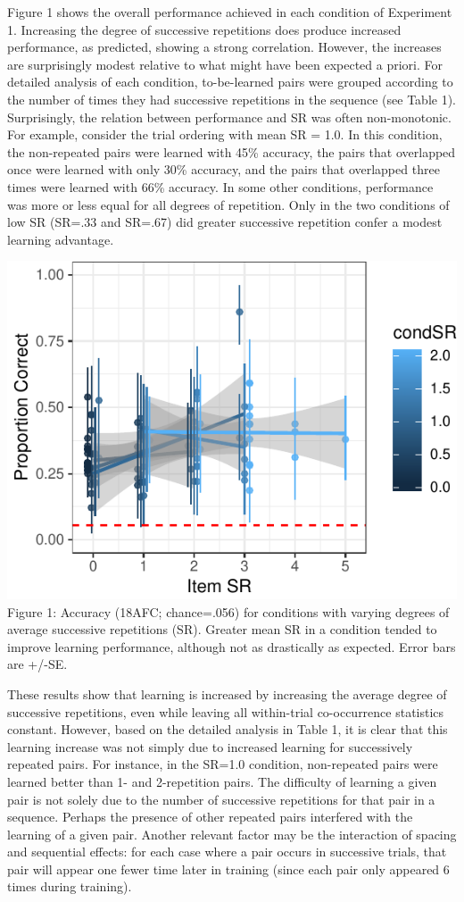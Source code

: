 \documentclass[man,floatsintext]{apa6}
\begin{document}
Figure 1 shows the overall performance achieved in each condition of Experiment 1. Increasing the degree of successive repetitions does produce increased performance, as predicted, showing a strong correlation. However, the increases are surprisingly modest relative to what might have been expected a priori. For detailed analysis of each condition, to-be-learned pairs were grouped according to the number of times they had successive repetitions in the sequence (see Table 1). Surprisingly, the relation between performance and SR was often non-monotonic. For example, consider the trial ordering with mean SR = 1.0. In this condition, the non-repeated pairs were learned with 45\% accuracy, the pairs that overlapped once were learned with only 30\% accuracy, and the pairs that overlapped three times were learned with 66\% accuracy. In some other conditions, performance was more or less equal for all degrees of repetition. Only in the two conditions of low SR (SR=.33 and SR=.67) did greater successive repetition confer a modest learning advantage.

\includegraphics{figs/fig1-exp1-1.pdf}
Figure 1: Accuracy (18AFC; chance=.056) for conditions with varying degrees of average successive repetitions (SR). Greater mean SR in a condition tended to improve learning performance, although not as drastically as expected. Error bars are +/-SE.

These results show that learning is increased by increasing the average degree of successive repetitions, even while leaving all within-trial co-occurrence statistics constant. However, based on the detailed analysis in Table 1, it is clear that this learning increase was not simply due to increased learning for successively repeated pairs. For instance, in the SR=1.0 condition, non-repeated pairs were learned better than 1- and 2-repetition pairs. The difficulty of learning a given pair is not solely due to the number of successive repetitions for that pair in a sequence. Perhaps the presence of other repeated pairs interfered with the learning of a given pair. Another relevant factor may be the interaction of spacing and sequential effects: for each case where a pair occurs in successive trials, that pair will appear one fewer time later in training (since each pair only appeared 6 times during training).
\end{document}
